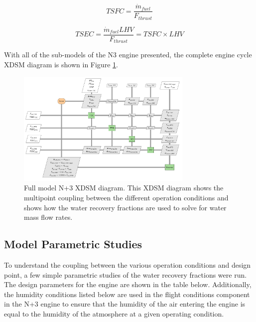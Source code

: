 \documentclass[conf]{new-aiaa}
\begin{document}
\begin{equation}
  TSFC = \frac{\Dot{m}_{fuel}}{F_{thrust}}
\end{equation}

\begin{equation}
  TSEC = \frac{\Dot{m}_{fuel} LHV}{F_{thrust}} = TSFC \times LHV
\end{equation}

With all of the sub-models of the N3 engine presented, the complete engine cycle XDSM diagram is shown in Figure \ref{fig:N3_xdsm_full}.

\begin{figure}[hbt!]
  \centering
  \includegraphics[width=0.75\textwidth]{N3_xdsm_full.pdf}
  \caption{
    Full model N+3 XDSM diagram.
    This XDSM diagram shows the multipoint coupling between the different operation conditions and shows how the water recovery fractions are used to solve for water mass flow rates.
  }
  \label{fig:N3_xdsm_full}
\end{figure}

\subsection{Model Parametric Studies}
To understand the coupling between the various operation conditions and design point, a few simple parametric studies of the water recovery fractions were run.
The design parameters for the engine are shown in the table below.
Additionally, the humidity conditions listed below are used in the flight conditions component in the N+3 engine to ensure that the humidity of the air entering the engine is equal to the humidity of the atmosphere at a given operating condition.
\end{document}
